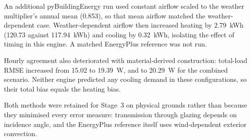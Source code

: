 An additional pyBuildingEnergy run used constant airflow scaled to the weather
multiplier's annual mean (0.853), so that mean airflow matched the
weather-dependent case. Weather-dependent airflow then increased heating by
2.79~kWh (120.73 against 117.94~kWh) and cooling by 0.32~kWh, isolating the
effect of timing in this engine. A matched EnergyPlus reference was not run.


Hourly agreement also deteriorated with material-derived construction:
total-load RMSE increased from 15.02 to 19.39~W, and to 20.29~W for the
combined scenario. Neither engine predicted any cooling demand in these
configurations, so their total bias equals the heating bias.


Both methods were retained for Stage~3 on physical grounds rather than
because they minimised every error measure: transmission through glazing
depends on incidence angle, and the EnergyPlus reference itself uses
wind-dependent exterior convection.


